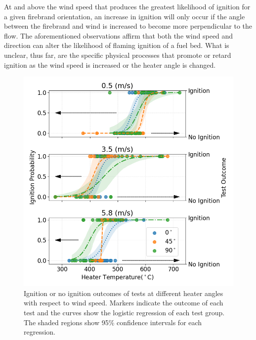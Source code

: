     At and above the wind speed that produces the greatest likelihood of ignition for a given firebrand orientation, an increase in ignition will only occur if the angle between the firebrand and wind is increased to become more perpendicular to the flow. 
    The aforementioned observations affirm that both the wind speed and direction can alter the likelihood of flaming ignition of a fuel bed. What is unclear, thus far, are the specific physical processes that promote or retard ignition as the wind speed is increased or the heater angle is changed.  
    
        \begin{figure}[hpbt]
            \centering
            \includegraphics[width=0.5\columnwidth]{Figures/stacked_wind_speed.png}
            \caption{Ignition or no ignition outcomes of tests at different heater angles with respect to wind speed. Markers indicate the outcome of each test and the curves show the logistic regression of each test group. The shaded regions show 95\% confidence intervals for each regression.}
            \label{fig:windSpeed}
        \end{figure}
    
